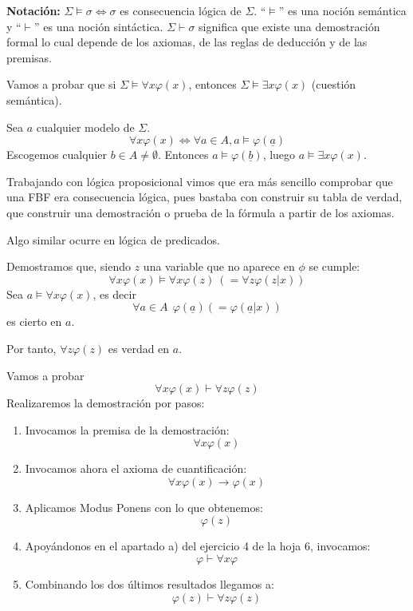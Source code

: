 \noindent \textbf{Notación: } $\Sigma \vDash \sigma \iff \sigma $ es consecuencia lógica de $\Sigma$. ``$\vDash$'' es una noción semántica y ``$\vdash$'' es una noción sintáctica. $\Sigma \vdash \sigma$ significa que existe una demostración formal lo cual depende de los axiomas, de las reglas de deducción y de las premisas.

\begin{example}
	Vamos a probar que si $\Sigma\vDash \forall x \varphi(x)$, entonces $\Sigma \vDash \exists x\varphi(x)$ (cuestión semántica).

	Sea $a$ cualquier modelo de $\Sigma$.
	\[\forall x\varphi(x) \iff \forall a\in A, a\vDash \varphi(\underline{a})\] Escogemos cualquier $b\in A\neq \emptyset$. Entonces $a\vDash \varphi(\underline{b})$, luego $a\vDash \exists x \varphi(x)$.
\end{example}

Trabajando con lógica proposicional vimos que era más sencillo comprobar que una FBF era consecuencia lógica, pues bastaba con construir su tabla de verdad, que construir una demostración o prueba de la fórmula a partir de los axiomas.

Algo similar ocurre en lógica de predicados.
\begin{example}
Demostramos que, siendo $z$ una variable que no aparece en $\phi$ se cumple:
\[\forall x \varphi(x) \vDash \forall x \varphi(z) \ \left(= \forall z \varphi(z|x)\right)\]
Sea $a\vDash \forall x \varphi(x)$, es decir
\[\forall a \in A \ \ \varphi(\underline{a})\left(= \varphi(\underline{a}|x)\right)\]
es cierto en $a$.

Por tanto, $\forall z \varphi(z)$ es verdad en $a$.
\end{example}

\begin{example}
Vamos a probar
\[\forall x \varphi(x) \vdash \forall z \varphi(z)\]
Realizaremos la demostración por pasos:
\begin{enumerate}
\item Invocamos la premisa de la demostración:
\[\forall x \varphi(x)\]

\item Invocamos ahora el axioma de cuantificación:
\[\forall x \varphi(x) \to \varphi(x)\]

\item Aplicamos Modus Ponens con lo que obtenemos:
\[\varphi(z)\]

\item Apoyándonos en el apartado a) del ejercicio 4 de la hoja 6, invocamos:
\[\varphi \vdash \forall x \varphi\]

\item Combinando los dos últimos resultados llegamos a:
\[\varphi(z) \vdash \forall z \varphi(z)\]
\end{enumerate}

\end{example}

